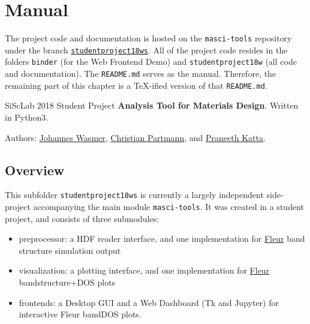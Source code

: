 
\chapter{Manual}
\label{cha:manual}

The project code and documentation is hosted on the \texttt{masci-tools}
repository \cite{masci-tools} under the branch
\href{https://github.com/JuDFTteam/masci-tools/tree/studentproject18ws}{\texttt{studentproject18ws}}.
All of the project code resides in the folders \texttt{binder} (for the Web
Frontend Demo) and \texttt{studentproject18w} (all code and documentation). The
\texttt{README.md} serves as the manual. Therefore, the remaining part of this
chapter is a \TeX{}-ified version of that \texttt{README.md}.

\vspace{3em}
\hdashrule{\textwidth}{2pt}{2pt}

SiScLab 2018 Student Project \textbf{Analysis Tool for Materials
  Design}. Written in Python3.

Authors: \href{https://github.com/Irratzo}{Johannes Wasmer},
\href{https://github.com/ChristianPartmann}{Christian Partmann}, and
\href{https://github.com/PraneethKatta}{Praneeth Katta}.

\section{Overview}\label{overview}

This subfolder \texttt{studentproject18ws} is currently a largely
independent side-project accompanying the main module
\texttt{masci-tools}. It was created in a student project, and consists
of three submodules:

\begin{itemize}
    \tightlist
\item
    preprocessor: a HDF reader interface, and one implementation for
    \href{http://www.judft.de}{Fleur} band structure simulation output
\item
    visualization: a plotting interface, and one implementation for
    \href{http://www.judft.de}{Fleur} bandstructure+DOS plots
\item
    frontends: a Desktop GUI and a Web Dashboard (Tk and Jupyter) for
    interactive Fleur bandDOS plots.
\end{itemize}

